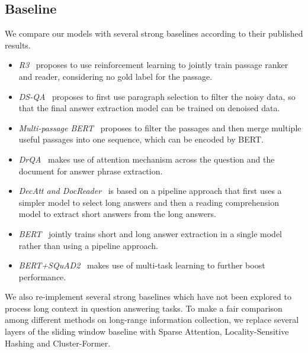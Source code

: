\documentclass[11pt,a4paper]{article}
\begin{document}
\subsection{Baseline}
We compare our models with several strong baselines according to their published results.
\begin{itemize}[itemsep=-5pt,topsep=2pt,leftmargin=12pt]
\item \textit{R3}~\cite{wang2018r} proposes to use reinforcement learning to jointly train passage ranker and reader, considering no gold label for the passage.

\item \textit{DS-QA}~\cite{lin2018denoising} proposes to first use paragraph selection to filter the noisy data, so that the final answer extraction model can be trained on denoised data.

\item \textit{Multi-passage BERT}~\cite{wang2019multi} proposes to filter the passages and then merge multiple useful passages into one sequence, which can be encoded by BERT.

\item \textit{DrQA}~\cite{chen2017reading} makes use of attention mechanism across the question and the document for answer phrase extraction.

\item \textit{DecAtt and DocReader}~\cite{kwiatkowski2019natural} is based on a pipeline approach that first uses a simpler model to select long answers and then a reading comprehension model to extract short answers from the long answers.

\item \textit{BERT}~\cite{alberti2019bert} jointly trains short and long answer extraction in a single model rather than using a pipeline approach.

\item \textit{BERT+SQuAD2}~\cite{pan2019frustratingly} makes use of multi-task learning to further boost performance.
\end{itemize}
We also re-implement several strong baselines which have not been explored to process long context in question answering tasks.
To make a fair comparison among different methods on long-range information collection, we replace several layers of the sliding window baseline with Sparse Attention, Locality-Sensitive Hashing and Cluster-Former.
\end{document}
